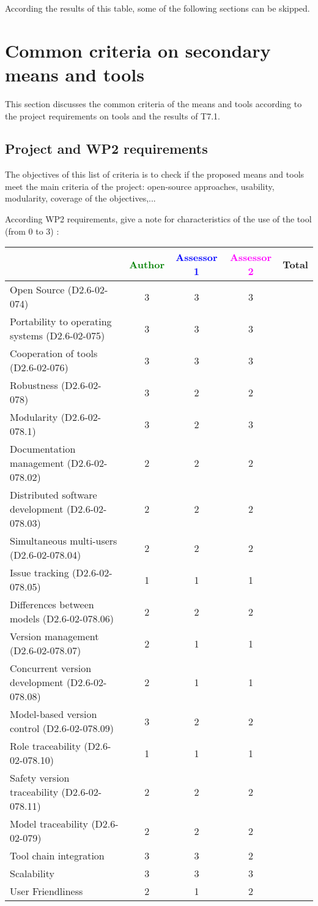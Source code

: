 According the results of this table, some of the following sections can be skipped.

\section{Common criteria on secondary means and tools}
\label{common}
This section discusses the common criteria of the means and tools according to the project requirements on tools and the results of T7.1.

\subsection{Project and WP2 requirements}

The objectives of this list of criteria is to check if the proposed means and tools meet the main criteria of the project: open-source approaches, usability, modularity, coverage of the objectives,...

According WP2 requirements, give a note for characteristics of the use of the tool (from 0 to 3) :

\begin{tabular}{|l | c | c | c | c|}
\hline
& \textcolor{green}{Author} & \textcolor{blue}{Assessor 1} & \textcolor{magenta}{Assessor 2} & Total \\
\hline
Open Source (D2.6-02-074) & 3 & 3 & 3 &  \\
\hline
Portability to operating systems (D2.6-02-075) & 3 & 3 & 3 &  \\
\hline
Cooperation of tools (D2.6-02-076) & 3 & 3 & 3 &  \\
\hline
Robustness (D2.6-02-078) & 3 & 2 & 2 & \\
\hline
Modularity (D2.6-02-078.1) & 3 & 2 & 3 & \\
\hline
Documentation management (D2.6-02-078.02) & 2 & 2 & 2 & \\
\hline
Distributed software development (D2.6-02-078.03)  & 2 & 2 & 2 & \\
\hline
Simultaneous multi-users (D2.6-02-078.04)   & 2 & 2 & 2 & \\
\hline
Issue tracking (D2.6-02-078.05) & 1 & 1 & 1 & \\
\hline
Differences between models (D2.6-02-078.06) & 2 & 2 & 2 & \\
\hline
Version management (D2.6-02-078.07) & 2 & 1 & 1 & \\
\hline
Concurrent version development (D2.6-02-078.08) & 2 & 1 & 1 & \\
\hline
Model-based version control (D2.6-02-078.09) & 3 & 2 & 2 & \\
\hline
Role traceability (D2.6-02-078.10) & 1 & 1 & 1 & \\
\hline
Safety version traceability (D2.6-02-078.11) & 2 & 2 & 2 & \\
\hline
Model traceability (D2.6-02-079) & 2 & 2 & 2 & \\
\hline
Tool chain integration & 3 & 3 & 2 & \\
\hline
Scalability & 3 & 3 & 3 & \\
\hline
User Friendliness & 2 & 1 & 2 & \\
\hline
\end{tabular}

